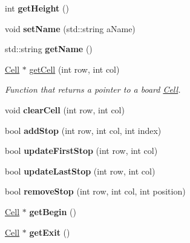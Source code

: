 \begin{DoxyCompactItemize}
\hypertarget{class_map_a2b09c8875af2efb711fc3a022e70427d}{}\label{class_map_a2b09c8875af2efb711fc3a022e70427d} 
int {\bfseries get\+Height} ()
\item 
\hypertarget{class_map_ac031089e3376749c6a9b97d0cce8c598}{}\label{class_map_ac031089e3376749c6a9b97d0cce8c598} 
void {\bfseries set\+Name} (std\+::string a\+Name)
\item 
\hypertarget{class_map_a67432b1e7f5ab087a75a74e2dd6589ec}{}\label{class_map_a67432b1e7f5ab087a75a74e2dd6589ec} 
std\+::string {\bfseries get\+Name} ()
\item 
\hypertarget{class_map_afc1c246f4bc6bde164ac2dafa79bf5fb}{}\label{class_map_afc1c246f4bc6bde164ac2dafa79bf5fb} 
\hyperlink{class_cell}{Cell} $\ast$ \hyperlink{class_map_afc1c246f4bc6bde164ac2dafa79bf5fb}{get\+Cell} (int row, int col)
\begin{DoxyCompactList}\small\item\em Function that returns a pointer to a board \hyperlink{class_cell}{Cell}. \end{DoxyCompactList}\item 
\hypertarget{class_map_a26b8b9bc68f8f7e5b4f74cbd3210dd30}{}\label{class_map_a26b8b9bc68f8f7e5b4f74cbd3210dd30} 
void {\bfseries clear\+Cell} (int row, int col)
\item 
\hypertarget{class_map_ad0af5ff34086a69ca33ac85969045751}{}\label{class_map_ad0af5ff34086a69ca33ac85969045751} 
bool {\bfseries add\+Stop} (int row, int col, int index)
\item 
\hypertarget{class_map_a382d1000a33c473bd96a619a0dd11d16}{}\label{class_map_a382d1000a33c473bd96a619a0dd11d16} 
bool {\bfseries update\+First\+Stop} (int row, int col)
\item 
\hypertarget{class_map_a0320959aa6cdae5dfe4cff3f79ebd40a}{}\label{class_map_a0320959aa6cdae5dfe4cff3f79ebd40a} 
bool {\bfseries update\+Last\+Stop} (int row, int col)
\item 
\hypertarget{class_map_a808119272b760e43615ffc396cf6feb6}{}\label{class_map_a808119272b760e43615ffc396cf6feb6} 
bool {\bfseries remove\+Stop} (int row, int col, int position)
\item 
\hypertarget{class_map_a9885a25e59304d88ea6d452d948a6f5c}{}\label{class_map_a9885a25e59304d88ea6d452d948a6f5c} 
\hyperlink{class_cell}{Cell} $\ast$ {\bfseries get\+Begin} ()
\item 
\hypertarget{class_map_a3c076465db569dc53d47b7429e785188}{}\label{class_map_a3c076465db569dc53d47b7429e785188} 
\hyperlink{class_cell}{Cell} $\ast$ {\bfseries get\+Exit} ()
\item 

\end{DoxyCompactItemize}
